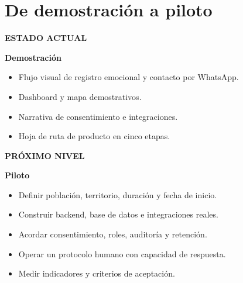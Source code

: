 \documentclass[11pt,a4paper]{article}
\begin{document}
\section{De demostración a piloto}

\begin{card}
  \begin{minipage}[t]{.21\linewidth}\vspace{0pt}
    {\small\bfseries\color{Sage}ESTADO ACTUAL}\par\smallskip
    {\Large\bfseries\color{Navy}Demostración}
  \end{minipage}\hfill
  \begin{minipage}[t]{.74\linewidth}\vspace{0pt}
    \begin{itemize}
      \item Flujo visual de registro emocional y contacto por WhatsApp.
      \item Dashboard y mapa demostrativos.
      \item Narrativa de consentimiento e integraciones.
      \item Hoja de ruta de producto en cinco etapas.
    \end{itemize}
  \end{minipage}
\end{card}

\vspace{3mm}
\begin{card}
  \begin{minipage}[t]{.21\linewidth}\vspace{0pt}
    {\small\bfseries\color{Terracotta}PRÓXIMO NIVEL}\par\smallskip
    {\Large\bfseries\color{Navy}Piloto}
  \end{minipage}\hfill
  \begin{minipage}[t]{.74\linewidth}\vspace{0pt}
    \begin{itemize}
      \item Definir población, territorio, duración y fecha de inicio.
      \item Construir backend, base de datos e integraciones reales.
      \item Acordar consentimiento, roles, auditoría y retención.
      \item Operar un protocolo humano con capacidad de respuesta.
      \item Medir indicadores y criterios de aceptación.
    \end{itemize}
  \end{minipage}
\end{card}
\end{document}
